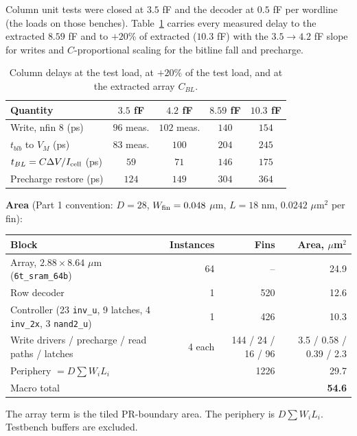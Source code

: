 \documentclass[10pt,letterpaper]{article}
\newcommand{\code}[1]{\texttt{#1}}
\begin{document}
Column unit tests were closed at $3.5$ fF and the decoder at $0.5$ fF per wordline (the loads on those benches). Table~\ref{tab:scale} carries every measured delay to the extracted $8.59$ fF and to $+20\%$ of extracted ($10.3$ fF) with the $3.5\to4.2$ fF slope for writes and $C$-proportional scaling for the bitline fall and precharge.

\begin{table}[H]\centering\small
\caption{Column delays at the test load, at $+20\%$ of the test load, and at the extracted array $C_{BL}$.}\label{tab:scale}
\begin{tabular}{@{}lcccc@{}}\toprule Quantity & $3.5$ fF & $4.2$ fF & $8.59$ fF & $10.3$ fF\\\midrule
Write, nfin 8 (ps) & $96$ meas. & $102$ meas. & $140$ & $154$\\
$t_{blb}$ to $V_M$ (ps) & $83$ meas. & $100$ & $204$ & $245$\\
$t_{BL}=C\Delta V/I_{\rm cell}$ (ps) & $59$ & $71$ & $146$ & $175$\\
Precharge restore (ps) & $124$ & $149$ & $304$ & $364$\\\bottomrule\end{tabular}
\end{table}

\textbf{Area} (Part 1 convention: $D=28$, $W_{\rm fin}=0.048$ $\mu$m, $L=18$ nm, $0.0242$ $\mu$m$^2$ per fin):
\begin{center}\small\begin{tabular}{lrrr}\toprule Block & Instances & Fins & Area, $\mu$m$^2$\\\midrule
Array, $2.88\times8.64$ $\mu$m (\code{6t\_sram\_64b}) & 64 & -- & 24.9\\
Row decoder & 1 & 520 & 12.6\\
Controller (23 \code{inv\_u}, 9 latches, 4 \code{inv\_2x}, 3 \code{nand2\_u}) & 1 & 426 & 10.3\\
Write drivers / precharge / read paths / latches & 4 each & 144 / 24 / 16 / 96 & 3.5 / 0.58 / 0.39 / 2.3\\\midrule
Periphery $=D\sum W_iL_i$ & & 1226 & 29.7\\
Macro total & & & \textbf{54.6}\\\bottomrule\end{tabular}\end{center}
The array term is the tiled PR-boundary area. The periphery is $D\sum W_iL_i$. Testbench buffers are excluded.

\end{document}

